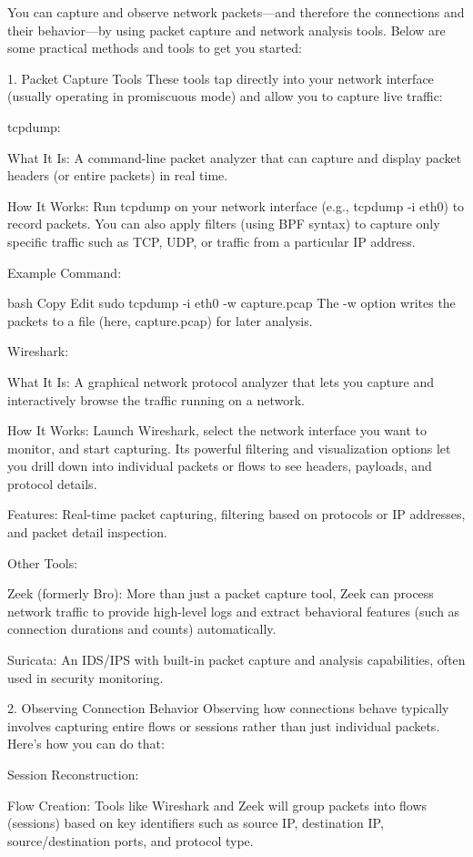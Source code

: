\documentclass{article}
\begin{document}
You can capture and observe network packets—and therefore the connections and their behavior—by using packet capture and network analysis tools. Below are some practical methods and tools to get you started:

1. Packet Capture Tools
These tools tap directly into your network interface (usually operating in promiscuous mode) and allow you to capture live traffic:

tcpdump:

What It Is: A command-line packet analyzer that can capture and display packet headers (or entire packets) in real time.

How It Works: Run tcpdump on your network interface (e.g., tcpdump -i eth0) to record packets. You can also apply filters (using BPF syntax) to capture only specific traffic such as TCP, UDP, or traffic from a particular IP address.

Example Command:

bash
Copy
Edit
sudo tcpdump -i eth0 -w capture.pcap
The -w option writes the packets to a file (here, capture.pcap) for later analysis.

Wireshark:

What It Is: A graphical network protocol analyzer that lets you capture and interactively browse the traffic running on a network.

How It Works: Launch Wireshark, select the network interface you want to monitor, and start capturing. Its powerful filtering and visualization options let you drill down into individual packets or flows to see headers, payloads, and protocol details.

Features: Real-time packet capturing, filtering based on protocols or IP addresses, and packet detail inspection.

Other Tools:

Zeek (formerly Bro): More than just a packet capture tool, Zeek can process network traffic to provide high-level logs and extract behavioral features (such as connection durations and counts) automatically.

Suricata: An IDS/IPS with built-in packet capture and analysis capabilities, often used in security monitoring.

2. Observing Connection Behavior
Observing how connections behave typically involves capturing entire flows or sessions rather than just individual packets. Here’s how you can do that:

Session Reconstruction:

Flow Creation: Tools like Wireshark and Zeek will group packets into flows (sessions) based on key identifiers such as source IP, destination IP, source/destination ports, and protocol type.
\end{document}

